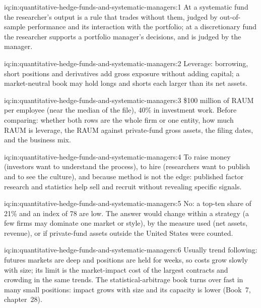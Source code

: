 \begin{solution}{iq:in:quantitative-hedge-funds-and-systematic-managers:1}
At a systematic fund the researcher's output is a rule that trades without them, judged by out-of-sample performance
and its interaction with the portfolio; at a discretionary fund the researcher supports a portfolio manager's decisions,
and is judged by the manager.
\end{solution}

\begin{solution}{iq:in:quantitative-hedge-funds-and-systematic-managers:2}
Leverage: borrowing, short positions and derivatives add gross exposure without adding capital; a market-neutral book
may hold longs and shorts each larger than its net assets.
\end{solution}

\begin{solution}{iq:in:quantitative-hedge-funds-and-systematic-managers:3}
\$100 million of RAUM per employee (near the median of the file), 40\% in investment work. Before comparing: whether both
rows are the whole firm or one entity, how much RAUM is leverage, the RAUM against private-fund gross assets, the filing
dates, and the business mix.
\end{solution}

\begin{solution}{iq:in:quantitative-hedge-funds-and-systematic-managers:4}
To raise money (investors want to understand the process), to hire (researchers want to publish and to see the
culture), and because method is not the edge: published factor research and statistics help sell and recruit without
revealing specific signals.
\end{solution}

\begin{solution}{iq:in:quantitative-hedge-funds-and-systematic-managers:5}
No: a top-ten share of 21\% and an index of 78 are low. The answer would change within a strategy (a few firms may
dominate one market or style), by the measure used (net assets, revenue), or if private-fund assets outside the United
States were counted.
\end{solution}

\begin{solution}{iq:in:quantitative-hedge-funds-and-systematic-managers:6}
Usually trend following: futures markets are deep and positions are held for weeks, so costs grow slowly with size;
its limit is the market-impact cost of the largest contracts and crowding in the same trends. The statistical-arbitrage
book turns over fast in many small positions: impact grows with size and its capacity is lower (Book~7, chapter~28).
\end{solution}
